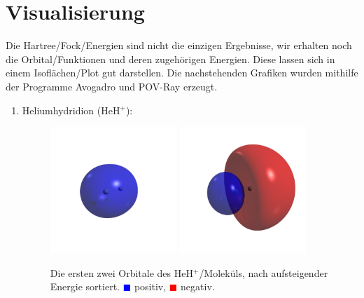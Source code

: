 \section{Visualisierung}
Die Hartree\-/Fock\-/Energien sind nicht die einzigen Ergebnisse,
wir erhalten noch die Orbital\-/Funktionen und deren zugehörigen Energien.
Diese lassen sich in einem Isoflächen\-/Plot gut darstellen.
Die nachstehenden Grafiken wurden mithilfe der Programme Avogadro \cite{avogadro}
und POV-Ray \cite{povray} erzeugt.
\begin{enumerate}\bfseries
\item Heliumhydridion (HeH$^+$):
\begin{figure}[H]
\centering
\includegraphics[trim=300 300 300 300, clip, width=0.45\textwidth]{res/HeH/heh_w0.png}
\includegraphics[trim=300 300 300 300, clip, width=0.45\textwidth]{res/HeH/heh_w1.png}
\caption{Die ersten zwei Orbitale des HeH$^+$\-/Moleküls,
nach aufsteigender Energie sortiert.
\textcolor{blue}{$\blacksquare$} positiv,
\textcolor{red}{$\blacksquare$} negativ.}\label{heh_orbitals}
\end{figure}


\end{enumerate}
